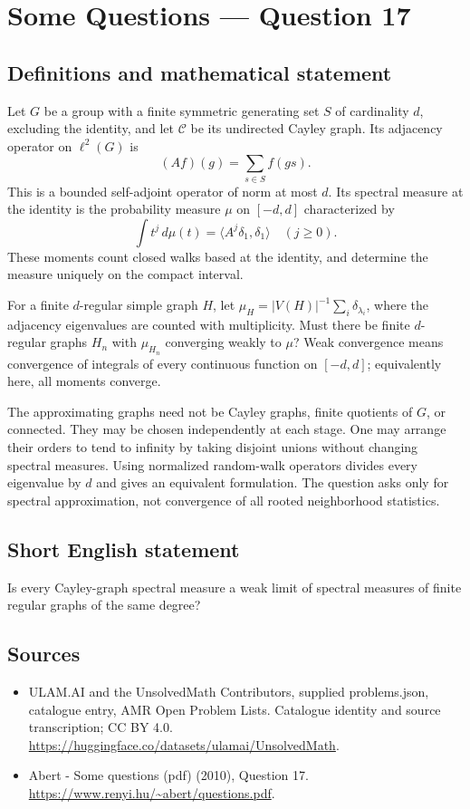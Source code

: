 \documentclass[11pt,a4paper]{article}
\begin{document}
\section*{Some Questions — Question 17}\label{statement}

\subsection{Definitions and mathematical statement}
Let $G$ be a group with a finite symmetric generating set $S$ of cardinality $d$, excluding the identity, and let $\mathcal C$ be its undirected Cayley graph. Its adjacency operator on $\ell^2(G)$ is
\[
 (Af)(g)=\sum_{s\in S}f(gs).
\]
This is a bounded self-adjoint operator of norm at most $d$. Its spectral measure at the identity is the probability measure $\mu$ on $[-d,d]$ characterized by
\[
 \int t^j\,d\mu(t)=\langle A^j\delta_1,\delta_1\rangle
                      \quad(j\geq0).
\]
These moments count closed walks based at the identity, and determine the measure uniquely on the compact interval.

For a finite $d$-regular simple graph $H$, let $\mu_H=|V(H)|^{-1}\sum_i\delta_{\lambda_i}$, where the adjacency eigenvalues are counted with multiplicity. Must there be finite $d$-regular graphs $H_n$ with $\mu_{H_n}$ converging weakly to $\mu$? Weak convergence means convergence of integrals of every continuous function on $[-d,d]$; equivalently here, all moments converge.

The approximating graphs need not be Cayley graphs, finite quotients of $G$, or connected. They may be chosen independently at each stage. One may arrange their orders to tend to infinity by taking disjoint unions without changing spectral measures. Using normalized random-walk operators divides every eigenvalue by $d$ and gives an equivalent formulation. The question asks only for spectral approximation, not convergence of all rooted neighborhood statistics.
\subsection{Short English statement}
Is every Cayley-graph spectral measure a weak limit of spectral measures of finite regular graphs of the same degree?
\subsection{Sources}
\begin{itemize}
\item[S1] ULAM.AI and the UnsolvedMath Contributors, supplied problems.json, catalogue entry, AMR Open Problem Lists. Catalogue identity and source transcription; CC BY 4.0.
\url{https://huggingface.co/datasets/ulamai/UnsolvedMath}.
\item[S2] Abert - Some questions (pdf) (2010), Question 17. 
\url{https://www.renyi.hu/~abert/questions.pdf}.
\end{itemize}
\end{document}
